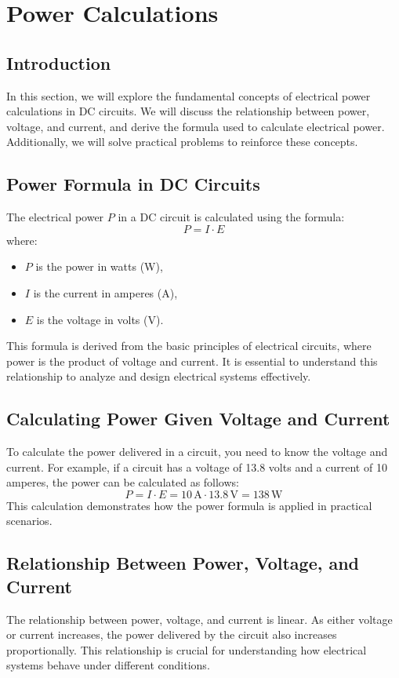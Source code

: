 \section{Power Calculations}
\label{section:power_calculations}

\subsection*{Introduction}
In this section, we will explore the fundamental concepts of electrical power calculations in DC circuits. We will discuss the relationship between power, voltage, and current, and derive the formula used to calculate electrical power. Additionally, we will solve practical problems to reinforce these concepts.

\subsection*{Power Formula in DC Circuits}
The electrical power \( P \) in a DC circuit is calculated using the formula:
\begin{equation}
    P = I \cdot E
    \label{eq:power_formula}
\end{equation}
where:
\begin{itemize}
    \item \( P \) is the power in watts (W),
    \item \( I \) is the current in amperes (A),
    \item \( E \) is the voltage in volts (V).
\end{itemize}

This formula is derived from the basic principles of electrical circuits, where power is the product of voltage and current. It is essential to understand this relationship to analyze and design electrical systems effectively.

\subsection*{Calculating Power Given Voltage and Current}
To calculate the power delivered in a circuit, you need to know the voltage and current. For example, if a circuit has a voltage of 13.8 volts and a current of 10 amperes, the power can be calculated as follows:
\[
P = I \cdot E = 10 \, \text{A} \cdot 13.8 \, \text{V} = 138 \, \text{W}
\]
This calculation demonstrates how the power formula is applied in practical scenarios.

\subsection*{Relationship Between Power, Voltage, and Current}
The relationship between power, voltage, and current is linear. As either voltage or current increases, the power delivered by the circuit also increases proportionally. This relationship is crucial for understanding how electrical systems behave under different conditions.

